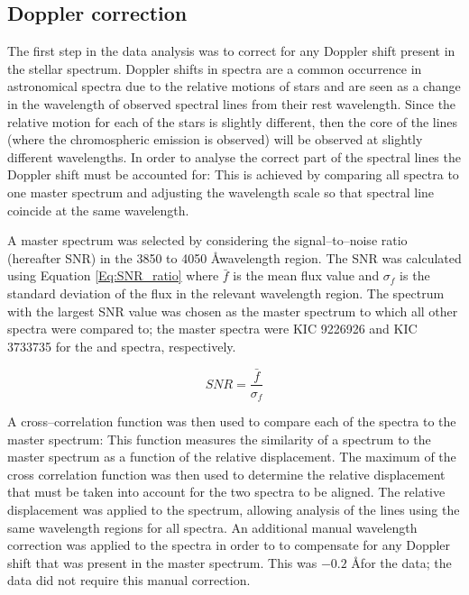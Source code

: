\subsection{Doppler correction}
\label{Chp4_data_analysis_doppler}
The first step in the data analysis was to correct for any Doppler shift present in the stellar spectrum. Doppler shifts in spectra are a common occurrence in astronomical spectra due to the relative motions of stars and are seen as a change in the wavelength of observed spectral lines from their rest wavelength. Since the relative motion for each of the stars is slightly different, then the core of the \caII lines (where the chromospheric emission is observed) will be observed at slightly different wavelengths. In order to analyse the correct part of the spectral lines the Doppler shift must be accounted for: This is achieved by comparing all spectra to one master spectrum and adjusting the wavelength scale so that spectral line coincide at the same wavelength.

A master spectrum was selected by considering the signal--to--noise ratio (hereafter SNR) in the 3850 to 4050 \AA \space wavelength region. The SNR was calculated using Equation \ref{Eq:SNR_ratio} where $\bar{f}$ is the mean flux value and $\sigma_{f}$ is the standard deviation of the flux in the relevant wavelength region. The spectrum with the largest SNR value was chosen as the master spectrum to which all other spectra were compared to; the master spectra were KIC 9226926 and KIC 3733735 for the \narval and \esp spectra, respectively.

\begin{equation}
SNR = \frac{\bar{f}}{\sigma_{f}}
\label{Eq:SNR_ratio}
\end{equation}

A cross--correlation function was then used to compare each of the spectra to the master spectrum: This function measures the similarity of a spectrum to the master spectrum as a function of the relative displacement. The maximum of the cross correlation function was then used to determine the relative displacement that must be taken into account for the two spectra to be aligned. The relative displacement was applied to the spectrum, allowing analysis of the \caII lines using the same wavelength regions for all spectra. An additional manual wavelength correction was applied to the spectra in order to to compensate for any Doppler shift that was present in the master spectrum. This was $-0.2$ \AA \space for the \esp data; the \narval data did not require this manual correction.

